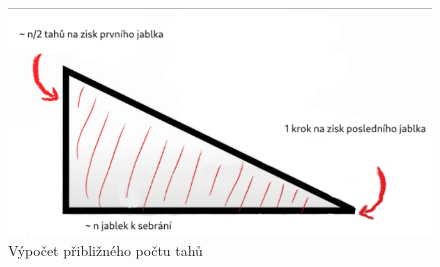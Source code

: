 \begin{figure}
    \centering
    \includegraphics[width=0.7\linewidth]{Images/HamiltonianCycleDuration.png}
    \caption[Dostupné z: \url{https://www.youtube.com/watch?v=TOpBcfbAgPg&t=245s&ab_channel=AlphaPhoenix}]{Výpočet přibližného počtu tahů}
    \label{fig:HamiltonianCycleDuration}
\end{figure}